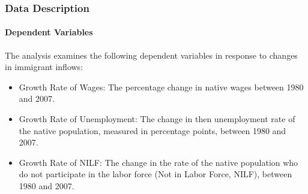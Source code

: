 
\begin{frame}
    \frametitle{Data Description}
    \framesubtitle{Dependent Variables}

The analysis examines the following dependent variables in response to changes in immigrant inflows:

\begin{itemize}
    \item Growth Rate of Wages: The percentage change in native wages between 1980 and 2007.
    \item Growth Rate of Unemployment: The change in then unemployment rate of the native population, measured in percentage points, between 1980 and 2007.
    \item Growth Rate of NILF: The change in the rate of the native population who do not participate in the labor force (Not in Labor Force, NILF), between 1980 and 2007. 
\end{itemize}
\end{frame}
